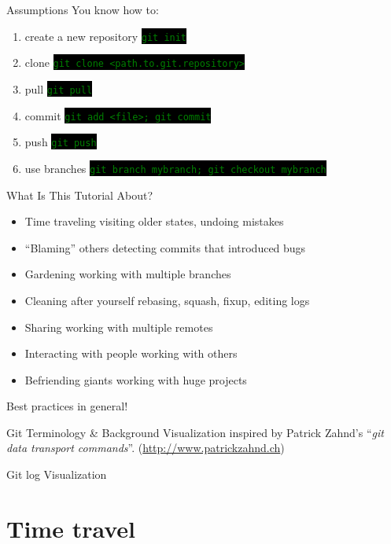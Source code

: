 \documentclass[
14pt,
aspectratio=169,
usenames,
dvipsnames,
x11names]{beamer}
\newcommand{\code}[1]{{\small\colorbox{black}{\textcolor{green}{\texttt{#1}}}}}
\newcommand{\buz}[2]{#1 \hfill \textcolor{Gray!50}{#2}}
\begin{document}
\begin{frame}{Assumptions}
  \alert{You} know how to:
  \begin{enumerate}
  \item create a new repository \hfill \code{git init}
  \item clone \hfill \code{git clone <path.to.git.repository>}
  \item pull \hfill \code{git pull}
  \item commit \hfill \code{git add <file>; git commit}
  \item push \hfill \code{git push}
  \item use branches \hfill \code{git branch mybranch; git checkout mybranch}
  \end{enumerate}
\end{frame}

\begin{frame}{What Is This Tutorial About?}
  \begin{itemize} \setlength{\itemsep}{\fill}
  \item \buz{Time traveling}{visiting older states, undoing mistakes}
  \item \buz{``Blaming'' others}{detecting commits that introduced bugs}
  \item \buz{Gardening}{working with multiple branches}
  \item \buz{Cleaning after yourself}{rebasing, squash, fixup, editing logs}
  \item \buz{Sharing}{working with multiple remotes}
  \item \buz{Interacting with people}{working with others}
  \item \buz{Befriending giants}{working with huge projects}
  \end{itemize}
  \centering
  \alert{Best practices} in general!
\end{frame}

\begin{frame}{Git Terminology \& Background}
  \centering
  \tiny
  Visualization inspired by Patrick Zahnd's ``\textit{git data transport commands}''. (\url{http://www.patrickzahnd.ch})
  \vfill
  \scriptsize
  
\end{frame}

\begin{frame}{Git log Visualization}
  \centering
  
\end{frame}

\section{Time travel}
\end{document}
